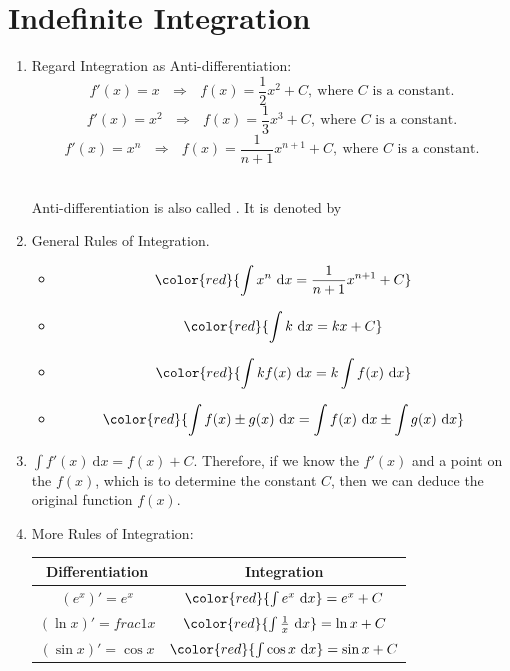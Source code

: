 \documentclass[12pt, a4paper]{article}
\begin{document}
\section{Indefinite Integration}
\begin{enumerate}
    \item Regard Integration as Anti-differentiation: 
    $$f'(x)=x\ \ \ \Rightarrow\ \ \ f(x)=\frac{1}{2}x^2+C,\ \text{where }C\text{ is a constant.}$$
    $$f'(x)=x^2\ \ \ \Rightarrow\ \ \ f(x)=\frac{1}{3}x^3+C,\ \text{where }C\text{ is a constant.}$$
    $$f'(x)=x^n\ \ \ \Rightarrow\ \ \ f(x)=\frac{1}{n+1}x^{n+1}+C,\ \text{where }C\text{ is a constant.}$$
    \begin{myclaim}{ }{}
        \\Anti-differentiation is also called \textbf{\color{red}{indefinited integration}}. It is denoted by {}
        \begin{center}{}\end{center}
    \end{myclaim}
    \item General Rules of Integration. 
    \begin{itemize}
        \item $${\color{red}{\int x^n\ \mathrm{d}x=\frac{1}{n+1}x^{n+1}+C}}$$
        \item $${\color{red}{\int k\ \mathrm{d}x=kx+C}}$$
        \item $${\color{red}{\int kf(x)\ \mathrm{d}x=k\int f(x)\ \mathrm{d}x}}$$
        \item $${\color{red}{\int f(x)\pm g(x)\ \mathrm{d}x=\int f(x)\ \mathrm{d}x\pm\int g(x)\ \mathrm{d}x}}$$
    \end{itemize}
    \item $\int f'(x)\ \mathrm{d}x=f(x)+C.$ Therefore, if we know the $f'(x)$ and a point on the $f(x)$, which is to determine the constant $C$, then we can deduce the original function $f(x)$.
    \item More Rules of Integration:
    \begin{center}\begin{tabular}{c|c}
        Differentiation&Integration\\\hline
        $(e^x)'=e^x$&${\color{red}{\int e^x\ \mathrm{d}x}=e^x+C}$\\
        $(\ln x)'=frac{1}{x}$&${\color{red}{\int \frac{1}{x}\ \mathrm{d}x}=\ln x+C}$\\
        $(\sin x)'=\cos x$&${\color{red}{\int \cos x\ \mathrm{d}x}=\sin x+C}$\\

\end{tabular}
\end{center}
\end{enumerate}
\end{document}
